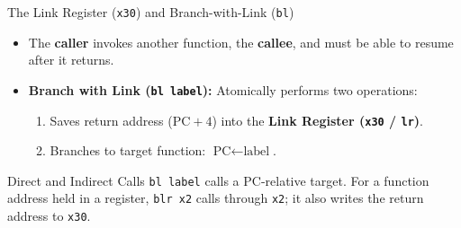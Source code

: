 \documentclass[aspectratio=169,11pt,t]{beamer}
\newcommand{\key}[1]{\textbf{#1}}
\newcommand{\bits}[1]{\texttt{#1}}
\newcommand{\code}[1]{\texttt{#1}}
\begin{document}
\begin{frame}{The Link Register (\texttt{x30}) and Branch-with-Link (\texttt{bl})}

\begin{itemize}\setlength{\itemsep}{6pt}
  \item The \key{caller} invokes another function, the \key{callee}, and must be able to resume after it returns.
  \item \key{Branch with Link (\code{bl label}):} Atomically performs two operations:
  \begin{enumerate}\setlength{\itemsep}{2pt}
    \item Saves return address ($\text{PC} + 4$) into the \key{Link Register (\bits{x30} / \bits{lr})}.
    \item Branches to target function: $\text{PC} \leftarrow \text{label}$.
  \end{enumerate}
\end{itemize}

\vspace{0.2cm}
\centering
{}

\vspace{0.3cm}
\begin{block}{Direct and Indirect Calls}
\code{bl label} calls a PC-relative target. For a function address held in a register, \code{blr x2} calls through \bits{x2}; it also writes the return address to \bits{x30}.
\end{block}
\end{frame}
\end{document}
